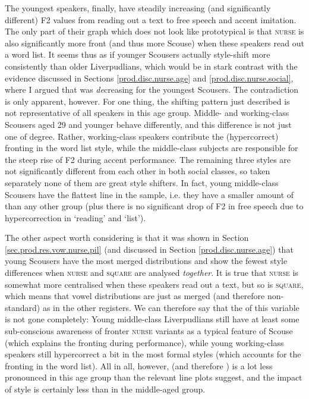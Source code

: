 The youngest speakers, finally, have steadily increasing (and significantly different) F2 values from reading out a text to free speech and accent imitation.
The only part of their graph which does not look like prototypical  is that \textsc{nurse} is also significantly more front (and thus more Scouse) when these speakers read out a word list.
It seems thus as if younger Scousers actually style-shift more consistently than older Liverpudlians, which would be in stark contrast with the evidence discussed in Sections \ref{prod.disc.nurse.age} and \ref{prod.disc.nurse.social}, where I argued that  was \emph{de}creasing for the youngest Scousers.
The contradiction is only apparent, however.
For one thing, the shifting pattern just described is not representative of all speakers in this age group.
Middle- and working-class Scousers aged 29 and younger behave differently, and this difference is not just one of degree.
Rather, working-class speakers contribute the (hypercorrect) fronting in the word list style, while the middle-class subjects are responsible for the steep rise of F2 during accent performance.
The remaining three styles are not significantly different from each other in both social classes, so taken separately none of them are great style shifters.
In fact, young middle-class Scousers have the flattest line in the sample, i.e. they have a smaller amount of  than any other group (plus there is no significant drop of F2 in free speech due to hypercorrection in `reading' and `list').

The other aspect worth considering is that it was shown in Section \ref{sec.prod.res.vow.nurse.pil} (and discussed in Section \ref{prod.disc.nurse.age}) that young Scousers have the most merged distributions and show the fewest style differences when \textsc{nurse} and \textsc{square} are analysed \emph{together}.
It is true that \textsc{nurse} is somewhat more centralised when these speakers read out a text, but so is \textsc{square}, which means that vowel distributions are just as merged (and therefore non-standard) as in the other registers.
We can therefore say that the  of this variable is not gone completely:
Young middle-class Liverpudlians still have at least some sub-conscious awareness of fronter \textsc{nurse} variants as a typical feature of Scouse (which explains the fronting during performance), while young working-class speakers still hypercorrect a bit in the most formal styles (which accounts for the fronting in the word list).
All in all, however,  (and therefore ) is a lot less pronounced in this age group than the relevant line plots suggest, and the impact of style is certainly less than in the middle-aged group.

